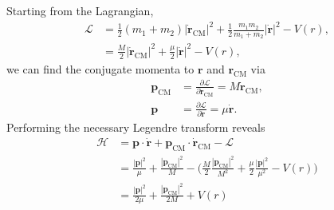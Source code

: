 \documentclass[../principles-of-quantum-mechanics.tex]{subfiles}
\begin{document}
\begin{questions}
		\begin{solution}
			Starting from the Lagrangian,
			\begin{align*}
				\mathcal{L} &= \frac{1}{2}(m_1+m_2)|\dot{\mathbf{r}}_{\mathrm{CM}}|^2 + \frac{1}{2}\frac{m_1m_2}{m_1+m_2}|\dot{\mathbf{r}}|^2 - V(r), \\
				&= \frac{M}{2}|\dot{\mathbf{r}}_{\mathrm{CM}}|^2 + \frac{\mu}{2}|\dot{\mathbf{r}}|^2 - V(r),
			\end{align*}
			we can find the conjugate momenta to $\mathbf{r}$ and $\mathbf{r}_{\mathrm{CM}}$ via
			\begin{align*}
				\mathbf{p}_{\mathrm{CM}} &= \frac{\partial\mathcal{L}}{\partial\dot{\mathbf{r}}_{\mathrm{CM}}} = M\dot{\mathbf{r}}_{\mathrm{CM}}, \\
				\mathbf{p} &= \frac{\partial\mathcal{L}}{\partial\dot{\mathbf{r}}} = \mu\dot{\mathbf{r}}.
			\end{align*}
			Performing the necessary Legendre transform reveals
			\begin{align*}
				\mathcal{H} &= \mathbf{p}\cdot\dot{\mathbf{r}} + \mathbf{p}_{\mathrm{CM}}\cdot\dot{\mathbf{r}}_{\mathrm{CM}} - \mathcal{L} \\
				&= \frac{|\mathbf{p}|^2}{\mu} + \frac{|\mathbf{p}_{\mathrm{CM}}|^2}{M} - \Big(\frac{M}{2}\frac{|\mathbf{p}_{\mathrm{CM}}|^2}{M^2} + \frac{\mu}{2}\frac{|\mathbf{p}|^2}{\mu^2} - V(r)\Big) \\
				&= \frac{|\mathbf{p}|^2}{2\mu} + \frac{|\mathbf{p}_{\mathrm{CM}}|^2}{2M} + V(r)
			\end{align*}
		\end{solution}
	\end{questions}
\end{document}
